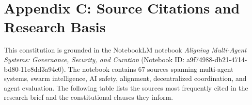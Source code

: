 \documentclass[12pt,letterpaper]{article}
\begin{document}
\section{Appendix C: Source Citations and Research Basis}
\label{appendix:sources}

This constitution is grounded in the NotebookLM notebook \textit{Aligning Multi-Agent Systems: Governance, Security, and Curation} (Notebook ID: a9f74988-db21-4714-bd80-11e8dd3a94c0). The notebook contains 67 sources spanning multi-agent systems, swarm intelligence, AI safety, alignment, decentralized coordination, and agent evaluation. The following table lists the sources most frequently cited in the research brief and the constitutional clauses they inform.
\end{document}
